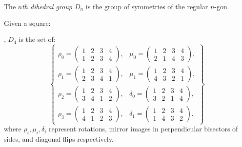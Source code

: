 \begin{definition}
    The \emph{$n$th dihedral group $D_n$} is the group of symmetries of the regular $n$-gon.
\end{definition}
\begin{example}
    Given a square: 
    , $D_4$ is the set of:
    \[
        \begin{Bmatrix}
            \rho_0 = \begin{pmatrix} 1 & 2 & 3 & 4\\ 1 & 2 & 3 & 4 \end{pmatrix}, &
            \mu_0 = \begin{pmatrix} 1 & 2 & 3 & 4 \\ 2 & 1 & 4 & 3 \end{pmatrix}, \\
            \rho_1 = \begin{pmatrix} 1 & 2 & 3 & 4\\ 2 & 3 & 4 & 1 \end{pmatrix}, &
            \mu_1 = \begin{pmatrix} 1 & 2 & 3 & 4 \\ 4 & 3 & 2 & 1 \end{pmatrix}, \\
            \rho_2 = \begin{pmatrix} 1 & 2 & 3 & 4\\ 3 & 4 & 1 & 2 \end{pmatrix}, &
            \delta_0 = \begin{pmatrix} 1 & 2 & 3 & 4 \\ 3 & 2 & 1 & 4 \end{pmatrix}, \\
            \rho_3 = \begin{pmatrix} 1 & 2 & 3 & 4\\ 4 & 1 & 2 & 3 \end{pmatrix}, &
            \delta_1 = \begin{pmatrix} 1 & 2 & 3 & 4 \\ 1 & 4 & 3 & 2 \end{pmatrix}.
        \end{Bmatrix}
        \]
    where $\rho_i, \mu_i, \delta_i$ represent rotations, mirror images in perpendicular bisectors of sides, and diagonal flips respectively.
\end{example}
